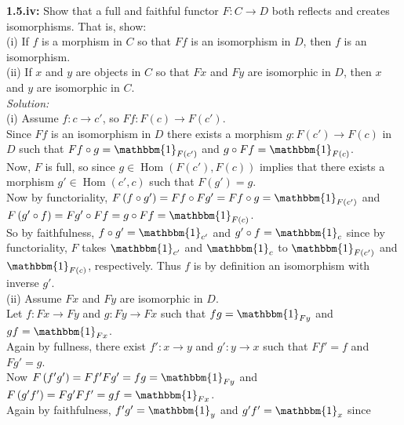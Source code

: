 \documentclass[a4paper]{article}
\DeclareMathOperator{\Hom}{Hom}
\begin{document}
    \textbf{1.5.iv:} Show that a full and faithful functor
    $F  \colon C \to D$ both reflects and creates isomorphisms. That is,
    show:\\
    (i) If $f$ is a morphism in $C$ so that $Ff$ is an isomorphism
    in $D$, then $f$ is an isomorphism.\\
    \linebreak
    (ii) If $x$ and $y$ are objects in $C$ so that $Fx$ and
    $Fy$ are isomorphic in $D$, then $x$ and $y$ are
    isomorphic in $C$.\\
    \linebreak
    \textit{Solution:}\\
    (i) Assume $f  \colon c\to c'$, so
    $Ff  \colon F(c) \to F(c')$. \\
    Since $Ff$ is an isomorphism in $D$ there
    exists a morphism $g  \colon F(c') \to F(c)$ in $D$ such that
    $Ff \circ g = \mathbbm{1}_{F(c')}$ and
     $g \circ Ff = \mathbbm{1}_{F(c)}$.\\
     Now, $F$ is full, so since $g \in \Hom 
     (F(c'), F(c))$ implies that there exists a morphism
     $g' \in \Hom (c', c)$ such that
     $F(g') = g$.\\
     Now by functoriality, 
     $F\left( f\circ g' \right) 
     = Ff \circ Fg' = Ff \circ g = \mathbbm{1}_{F(c')}$ and
     $F\left( g' \circ f \right) 
     = Fg' \circ Ff = g \circ Ff = \mathbbm{1}_{F(c)}$.\\
     So by faithfulness, 
     $f \circ g' = \mathbbm{1}_{c'}$ and
     $g' \circ f = \mathbbm{1}_{c}$ since
     by functoriality, $F$ takes $\mathbbm{1}_{c'}$ and
     $\mathbbm{1}_{c}$ to $\mathbbm{1}_{F(c')}$ and
     $\mathbbm{1}_{F(c)}$, respectively. Thus
     $f$ is by definition an isomorphism with inverse
     $g'$.\\
     \linebreak
     (ii) Assume $Fx$ and $Fy$ are isomorphic in $D$.\\
     Let $f  \colon Fx \to Fy$ and $g  \colon Fy \to Fx$ such
     that $fg = \mathbbm{1}_{Fy}$ and $gf = \mathbbm{1}_{Fx}$.\\
     Again by fullness, there exist
     $f'  \colon x \to y$ and $g'  \colon y\to x$ such that
     $Ff' = f$ and $Fg' = g$.\\
     Now $F\left( f' g' \right) =
     Ff' Fg' = fg = \mathbbm{1}_{Fy}$ and
     $F\left( g' f' \right) = Fg' Ff' = gf = \mathbbm{1}_{Fx}$.\\
     Again by faithfulness, 
     $f' g' = \mathbbm{1}_y$ and $g' f' = \mathbbm{1}_x$ since
\end{document}
